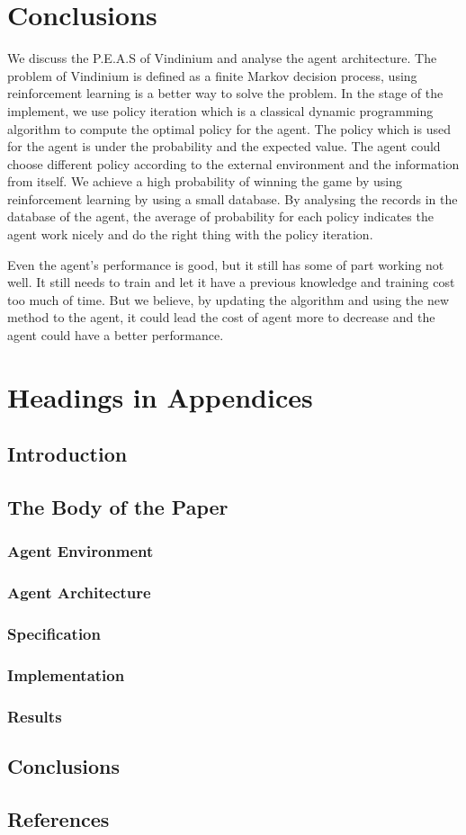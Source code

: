 \section{Conclusions}
We discuss the P.E.A.S of Vindinium and analyse the agent architecture.  The problem of Vindinium is defined as a finite Markov decision process, using reinforcement learning is a better way to solve the problem. In the stage of the implement, we use policy iteration which is a classical dynamic programming algorithm to compute the optimal policy for the agent. The policy which is used for the agent is under the probability and the expected value. The agent could choose different policy according to the external environment and the information from itself. We achieve a high probability of winning the game by using reinforcement learning by using a small database. By analysing the records in the database of the agent, the average of probability for each policy indicates the agent work nicely and do the right thing with the policy iteration. 

Even the agent's performance is good, but it still has some of part working not well. It still needs to train and let it have a previous knowledge and training cost too much of time. But we believe, by updating the algorithm and using the new method to the agent, it could lead the cost of agent more to decrease and the agent could have a better performance.



\appendix
\section{Headings in Appendices}

\subsection{Introduction}
\subsection{The Body of the Paper}
\subsubsection{Agent Environment}
\subsubsection{Agent Architecture}
\subsubsection{Specification}
\subsubsection{Implementation}
\subsubsection{Results}
\subsection{Conclusions}
\subsection{References}

